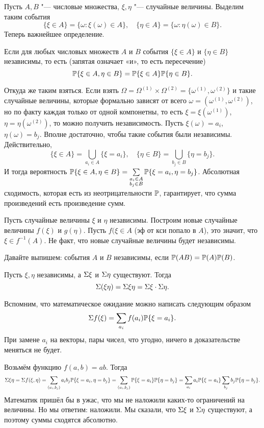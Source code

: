 Пусть $A,B$ "--- числовые множества, $\xi,\eta$ "--- случайные величины. Выделим таким события
\[
  \{\xi\in A\} = \big\{\omega\colon \xi(\omega)\in A\big\},\quad
  \{\eta\in A\} = \big\{\omega\colon \eta(\omega)\in B\big\}.
\]
Теперь важнейшее определение.
\begin{Def}
  Если для любых числовых множеств $A$ и $B$ события $\{\xi\in A\}$  и $\{\eta\in B\}$ независимы, то есть (запятая означает «и», то есть пересечение)
\[
  \P\{\xi\in A,\eta\in B\} = \P\{\xi\in A\} \P\{\eta\in B\}.
\]
\end{Def}

Откуда же таким взяться. Если взять $\Omega = \Omega^{(1)} \times \Omega^{(2)} = \{\omega^{(1)},\omega^{(2)}\}$ и такие случайные величины, которые формально зависят от всего $\omega = (\omega^{(1)},\omega^{(2)})$, но по факту каждая только от одной компонетны, то есть $\xi = \xi(\omega^{(1)})$, $\eta = \eta(\omega^{(2)})$, то можно получить независимость. Пусть $\xi(\omega) = a_i$, $\eta(\omega) = b_j$. Вполне достаточно, чтобы такие события были независимы. Действительно,
\[
  \{\xi\in A\} = \bigcup\limits_{a_i\in A}\{\xi = a_i\},\quad
  \{\eta\in B\} = \bigcup\limits_{b_j\in B}\{\eta = b_j\}.
\]
И тогда вероятность $\P\{\xi\in A,\eta\in B\} = \sum\limits_{\substack{a_i\in A\\ b_j\in B}} \P\{\xi = a_i,\eta = b_j\}$. Абсолютная сходимость, которая есть из неотрицательности $\P$, гарантирует, что сумма произведений есть произведение сумм.

Пусть случайные величины $\xi$ и $\eta$ независимы. Построим новые случайные величины $f(\xi)$ и $g(\eta)$. Пусть $f(\xi\in A$ (эф от кси попало в $A$), это значит, что $\xi\in f^{-1}(A)$. Не факт, что новые случайные величины будет независимы.

Давайте выпишем: события $A$ и $B$ независимы, если $\P(AB) = \P(A)\P(B)$.
\begin{Lem}
Пусть $\xi,\eta$ независимы, а $\E\xi$ и $\E\eta$ существуют. Тогда
\[
  \E(\xi\eta) = \E \xi\eta = \E\xi\cdot \E\eta.
\]
\end{Lem}
\begin{Proof}
Вспомним, что математическое ожидание можно написать следующим образом
\[
  \E f(\xi) = \sum\limits_{a_i} f(a_i)\P\{\xi=a_i\}.
\]
При замене $a_i$ на векторы, пары чисел, что угодно, ничего в доказательстве меняться не будет.

Возьмём функцию $f(a,b) = ab$. Тогда
\[
  \E\xi\eta = \E f(\xi,\eta) = \sum\limits_{(a_i,b_j)} a_ib_j\P\{\xi=a_i,\eta=b_j\} =
  \sum\limits_{(a_i,b_j)} \P\{\xi = a_i\}\P\{\eta=b_j\}=
  \sum\limits_{a_i} a_i\P\{\xi = a_i\} \sum\limits_{b_j}b_j\P\{\eta = b_j\}.
\]
Математик пришёл бы в ужас, что мы не наложили каких-то ограничений на величины. Но мы ответим: наложили. Мы сказали, что $\E\xi$ и $\E\eta$ существуют, а поэтому суммы сходятся абсолютно.
\end{Proof}

